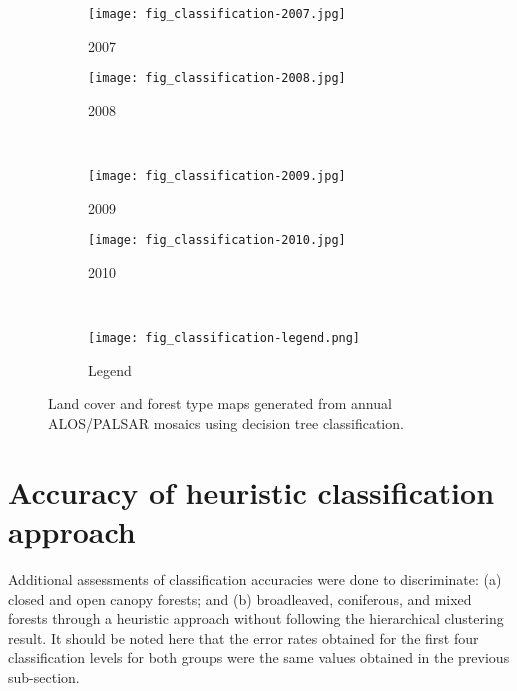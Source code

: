 \begin{figure}[!ht] \centering
	\captionsetup[subfigure]{width=2.0in} %
	\begin{subfigure}[t]{0.49\textwidth}
		\texttt{[image: fig\_classification-2007.jpg]}
		\caption[Land cover and forest type maps.]{2007}
		\label{fig: result-fig4.15a}
	\end{subfigure}
	\begin{subfigure}[t]{0.49\textwidth}
		\texttt{[image: fig\_classification-2008.jpg]}
		\caption[Land cover and forest type maps.]{2008}
		\label{fig: result-fig4.15b}
	\end{subfigure}\\
	\vspace{10pt}
	\begin{subfigure}[t]{0.49\textwidth}
		\texttt{[image: fig\_classification-2009.jpg]}
		\caption[Land cover and forest type maps.]{2009}
		\label{fig: result-fig4.15c}
	\end{subfigure}
	\begin{subfigure}[t]{0.49\textwidth}
		\texttt{[image: fig\_classification-2010.jpg]}
		\caption[Land cover and forest type maps.]{2010}
		\label{fig: result-fig4.15d}
	\end{subfigure}\\
	\vspace{10pt}
	\begin{subfigure}[t]{0.25\textwidth}
		\texttt{[image: fig\_classification-legend.png]}
		\caption[Land cover and forest type maps.]{Legend}
		\label{fig: result-fig4.15e}
	\end{subfigure}
	\vspace{5pt}
	\caption[Land cover and forest type maps generated from annual ALOS/PALSAR mosaics using decision tree classification.]{Land cover and forest type maps generated from annual ALOS/PALSAR mosaics using decision tree classification.}
	\label{fig: result-fig4.15}
\end{figure}

\section{Accuracy of heuristic classification approach}
\label{sec: result-accuracy-heuristic}

Additional assessments of classification accuracies were done to discriminate: (a) closed and open canopy forests; and (b) broadleaved, coniferous, and mixed forests through a heuristic approach without following the hierarchical clustering result. It should be noted here that the error rates obtained for the first four classification levels for both groups were the same values obtained in the previous sub-section.


